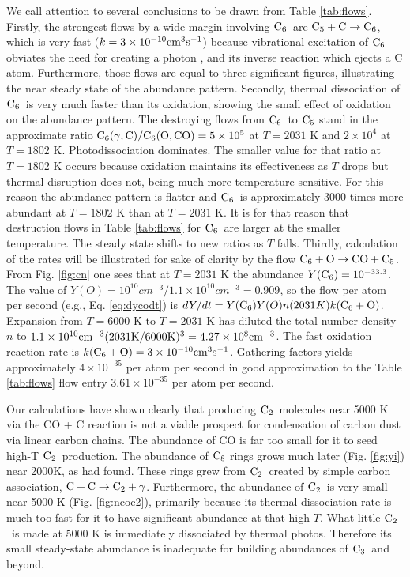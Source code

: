 \documentclass[manuscript]{aastex}
\newcommand{\ctwo}{{\rm C}_2}
\newcommand{\cthree}{{\rm C}_3}
\newcommand{\cfive}{{\rm C}_5}
\newcommand{\csix}{{\rm C}_6}
\newcommand{\ceight}{{\rm C}_8}
\newcommand{\twoctoctwo}{${\rm C} + {\rm C} \to \ctwo + \gamma$}
\newcommand{\cfivectocsix}{$\cfive + {\rm C} \to \csix$}
\newcommand{\csixotococfive}{${\rm C}_6 + {\rm O} \to {\rm CO} + {\rm C_5}$}
\begin{document}
We call attention to several conclusions to be drawn from Table \ref{tab:flows}.
Firstly, the strongest flows by a wide margin involving $\csix$\ are
\cfivectocsix,
which is very fast ($k = 3 \times 10^{-10} {\rm cm}^3 {\rm s}^{-1}$)
because vibrational excitation of $\csix$
obviates the need for creating a photon \citep{1999Sci...283.1290C},
and its inverse reaction which ejects a C atom. Furthermore, those flows
are equal to three significant figures, illustrating the near steady
state of the abundance pattern. Secondly, thermal dissociation of $\csix$\ is
very much faster than its oxidation, showing the small effect of oxidation
on the abundance pattern. The destroying flows from $\csix$\ to $\cfive$
stand in the approximate ratio
${\rm C}_6(\gamma,{\rm C})/{\rm C_6}({\rm O},{\rm CO}) = 5 \times 10^5$
at $T = 2031$ K and $2 \times 10^4$ at $T = 1802$ K.
Photodissociation dominates. The smaller value for that ratio at $T=1802$ K
occurs because oxidation maintains its effectiveness as $T$ drops but
thermal disruption does not, being much more temperature sensitive.
For this reason the abundance pattern is flatter and $\csix$\ is approximately
3000 times more abundant at $T=1802$ K than at $T=2031$ K.
It is for that reason that destruction flows in Table \ref{tab:flows}
for $\csix$\ are
larger at the smaller temperature.
The steady state shifts to new ratios as $T$ falls.
Thirdly, calculation of the rates will be illustrated for sake of clarity
by the flow
\csixotococfive.
From Fig. \ref{fig:cn}
one sees that at $T = 2031$ K the abundance $Y(\csix) = 10^{-33.3}$.
The value of $Y(O) = 10^{10} cm^{-3} / 1.1 \times 10^{10} cm^{-3} = 0.909$,
so the flow per atom per
second (e.g., Eq. \ref{eq:dycodt}) is
$dY/dt= Y(\csix)Y(O)n(2031K)k(\csix + {\rm O})$.
Expansion from $T=6000$ K to $T=2031$ K has diluted the total number
density $n$ to $1.1 \times 10^{10}{\rm cm}^{-3}
(2031 {\rm K}/6000 {\rm K})^3 = 4.27 \times 10^8{\rm cm}^{-3}$.
The fast oxidation reaction rate is
$k(\csix + {\rm O}) = 3 \times 10^{-10} {\rm cm}^3{\rm s}^{-1}$.
Gathering factors yields approximately $4 \times 10^{-35}$ per atom
per second
in good approximation to the Table \ref{tab:flows}
flow entry $3.61 \times 10^{-35}$ per atom per second.

Our calculations have shown clearly that producing $\ctwo$\ molecules near
5000 K via the CO + C reaction \citep{2009ApJ...703..642C} is not a viable
prospect for condensation of carbon dust via linear carbon chains.
The abundance of CO is far too small for it to seed high-T $\ctwo$\ production.
The abundance of $\ceight$
rings grows much later (Fig. \ref{fig:yi}) near 2000K, as
\citet{1999Sci...283.1290C,2001ApJ...562..480C} had found.
These rings grew from $\ctwo$\ created by simple carbon association,
\twoctoctwo.
Furthermore, the abundance of $\ctwo$\ is very small near 5000 K
(Fig. \ref{fig:ncoc2}),
primarily because its thermal dissociation rate is much too fast for
it to have significant abundance at that high $T$.
What little $\ctwo$\ is made at 5000 K is immediately dissociated by
thermal photos. Therefore its small steady-state abundance is inadequate
for building abundances of $\cthree$\ and beyond. 
\end{document}
